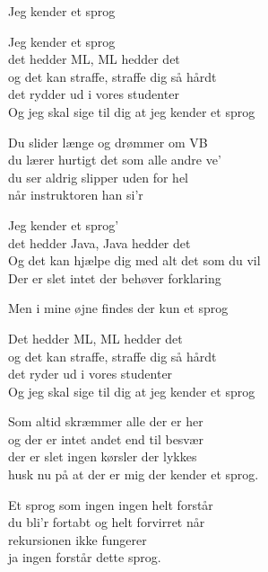 \begin{song}{Jeg kender et sprog}
  \begin{SBChorus}
    Jeg kender et sprog \\
    det hedder ML, ML hedder det \\
    og det kan straffe, straffe dig så hårdt \\
    det rydder ud i vores studenter \\
    Og jeg skal sige til dig at jeg kender et sprog \\
  \end{SBChorus}
  
  \begin{SBVerse}
    Du slider længe og drømmer om VB \\
    du lærer hurtigt det som alle andre ve' \\
    du ser aldrig slipper uden for hel \\
    når instruktoren han si'r \\
  \end{SBVerse}
  
  
  \begin{SBChorus}
    Jeg kender et sprog' \\
    det hedder Java, Java hedder det \\
    Og det kan hjælpe dig med alt det som du vil \\
    Der er slet intet der behøver forklaring \\
  \end{SBChorus}
  
  \begin{SBSection*}
    Men i mine øjne findes der kun et sprog \\
  \end{SBSection*}
  
  
  \begin{SBChorus}
    Det hedder ML, ML hedder det \\
    og det kan straffe, straffe dig så hårdt \\
    det ryder ud i vores studenter \\
    Og jeg skal sige til dig at jeg kender et sprog \\
  \end{SBChorus}
  
  \begin{SBVerse}
    Som altid skræmmer alle der er her \\
    og der er intet andet end til besvær \\
    der er slet ingen kørsler der lykkes \\
    husk nu på at der er mig der kender et sprog. \\
  \end{SBVerse}
  
  \begin{SBVerse}
    Et sprog som ingen ingen helt forstår \\
    du bli'r fortabt og helt forvirret når \\
    rekursionen ikke fungerer \\
    ja ingen forstår dette sprog. \\
  \end{SBVerse}
\end{song}